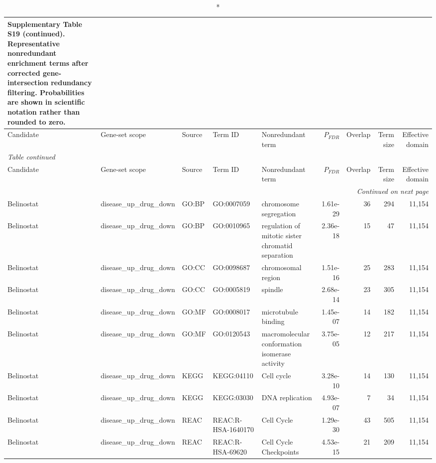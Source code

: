 \begin{landscape}
\begingroup
\scriptsize
\begin{longtable}{@{}p{2.0cm}p{3.1cm}p{1.2cm}p{2.2cm}p{6.3cm}rrrr@{}}
\caption*{Supplementary Table S19 (continued). Representative nonredundant enrichment terms after corrected gene-intersection redundancy filtering. Probabilities are shown in scientific notation rather than rounded to zero.}\\
\toprule
Candidate & Gene-set scope & Source & Term ID & Nonredundant term & $P_{FDR}$ & Overlap & Term size & Effective domain \\
\midrule
\endfirsthead
\multicolumn{9}{l}{\textit{Table continued}}\\
\toprule
Candidate & Gene-set scope & Source & Term ID & Nonredundant term & $P_{FDR}$ & Overlap & Term size & Effective domain \\
\midrule
\endhead
\midrule
\multicolumn{9}{r}{\textit{Continued on next page}}\\
\endfoot
\bottomrule
\endlastfoot
Belinostat & disease\_up\_drug\_down & GO:BP & GO:0007059 & chromosome segregation & 1.61e-29 & 36 & 294 & 11,154 \\
Belinostat & disease\_up\_drug\_down & GO:BP & GO:0010965 & regulation of mitotic sister chromatid separation & 2.36e-18 & 15 & 47 & 11,154 \\
Belinostat & disease\_up\_drug\_down & GO:CC & GO:0098687 & chromosomal region & 1.51e-16 & 25 & 283 & 11,154 \\
Belinostat & disease\_up\_drug\_down & GO:CC & GO:0005819 & spindle & 2.68e-14 & 23 & 305 & 11,154 \\
Belinostat & disease\_up\_drug\_down & GO:MF & GO:0008017 & microtubule binding & 1.45e-07 & 14 & 182 & 11,154 \\
Belinostat & disease\_up\_drug\_down & GO:MF & GO:0120543 & macromolecular conformation isomerase activity & 3.75e-05 & 12 & 217 & 11,154 \\
Belinostat & disease\_up\_drug\_down & KEGG & KEGG:04110 & Cell cycle & 3.28e-10 & 14 & 130 & 11,154 \\
Belinostat & disease\_up\_drug\_down & KEGG & KEGG:03030 & DNA replication & 4.93e-07 & 7 & 34 & 11,154 \\
Belinostat & disease\_up\_drug\_down & REAC & REAC:R-HSA-1640170 & Cell Cycle & 1.29e-30 & 43 & 505 & 11,154 \\
Belinostat & disease\_up\_drug\_down & REAC & REAC:R-HSA-69620 & Cell Cycle Checkpoints & 4.53e-15 & 21 & 209 & 11,154 \\

\end{longtable}
\end{landscape}

